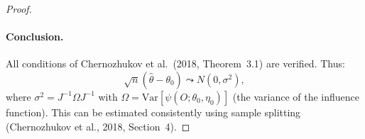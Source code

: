 \begin{proof}
\paragraph{Conclusion.}
All conditions of Chernozhukov et al.\ (2018, Theorem~3.1) are verified. Thus:
\[
\sqrt{n}(\hat\theta - \theta_0) \leadsto N(0, \sigma^2),
\]
where $\sigma^2 = J^{-1} \Omega J^{-1}$ with $\Omega = \text{Var}[\psi(O; \theta_0, \eta_0)]$ (the variance of the influence function). This can be estimated consistently using sample splitting (Chernozhukov et al., 2018, Section~4).
\end{proof}





